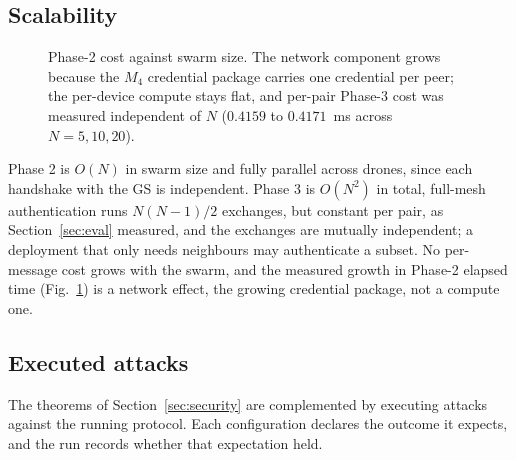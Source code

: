 \documentclass[journal]{IEEEtran}
\begin{document}
\subsection{Scalability}
\label{sec:scale}

\begin{figure}[H]
\centering
{}
\caption{Phase-2 cost against swarm size. The network component grows because
the $M_4$ credential package carries one credential per peer; the per-device
compute stays flat, and per-pair Phase-3 cost was measured independent of $N$
($0.4159$ to $0.4171$~ms across $N=5,10,20$).}
\label{fig:scale}
\end{figure}

Phase 2 is $O(N)$ in swarm size and fully parallel across drones, since each
handshake with the GS is independent. Phase 3 is $O(N^2)$ in total, full-mesh
authentication runs $N(N-1)/2$ exchanges, but constant per pair, as
Section~\ref{sec:eval} measured, and the exchanges are mutually independent; a
deployment that only needs neighbours may authenticate a subset. No per-message
cost grows with the swarm, and the measured growth in Phase-2 elapsed time
(Fig.~\ref{fig:scale}) is a network effect, the growing credential package,
not a compute one.

\subsection{Executed attacks}
\label{sec:attacks}

The theorems of Section~\ref{sec:security} are complemented by executing
attacks against the running protocol. Each configuration declares the outcome
it expects, and the run records whether that expectation held.
\end{document}
